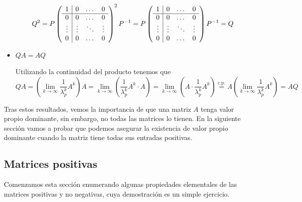 \documentclass[size=a4, parskip=half, titlepage=false, toc=flat, toc=bib, 12pt, twoside]{scrartcl}
\makeatletter
\renewenvironment{proof}[1][\proofname] {\par\pushQED{\qed}\normalfont\topsep6\p@\@plus6\p@\relax\trivlist\item[\hskip\labelsep\itshape\tgpaella#1\@addpunct{.}]\ignorespaces}{\popQED\endtrivlist\@endpefalse}
\theoremstyle{theorem-style}
\theoremstyle{definition-style}
\theoremstyle{remark-style}
\theoremstyle{example-style}
\theoremstyle{definition-style}
\theoremstyle{remark-style}
\renewcommand{\proofname}{\normalfont\tgpaella\bfseries\small DEMOSTRACIÓN}
\makeatother
\begin{document}
\begin{proof}
\begin{itemize}
$$Q^2 = P \left(
      \begin{array}{{c|ccc}}
            1         &    0      &   \dots    & 0\\\hline
            0         &    0       &    \dots    & 0 \\
            \vdots    &    \vdots  &  \ddots &  \vdots \\
           0          &     0       &    \dots    & 0
      \end{array}   \right)^2 P^{-1} = P \left(
            \begin{array}{{c|ccc}}
                  1         &    0      &   \dots    & 0\\\hline
                  0         &    0       &    \dots    & 0 \\
                  \vdots    &    \vdots  &  \ddots &  \vdots \\
                 0          &     0       &    \dots    & 0
            \end{array}   \right) P^{-1} = Q $$
\item $QA = AQ$

Utilizando la continuidad del producto tenemos que
$$QA = (\lim_{k \to \infty} \frac{1}{\lambda_p^k} A^k)A = \lim_{k \to \infty} (\frac{1}{\lambda_p^k} A^k \cdot A) = \lim_{k \to \infty} (A \cdot \frac{1}{\lambda_p^k} A^k) \overset{\textrm{c.p.}} = A ( \lim_{k \to \infty} \frac{1}{\lambda_p^k} A^k) = AQ$$

\end{itemize}
\end{proof}

Tras estos resultados, vemos la importancia de que una matriz $A$ tenga valor propio dominante, sin embargo, no todas las matrices lo tienen. En la siguiente sección vamos a probar que podemos asegurar la existencia de valor propio dominante cuando la matriz tiene todas sus entradas positivas.

\subsection{Matrices positivas}

Comenzamos esta sección enumerando algunas propiedades elementales de las matrices positivas y no negativas, cuya demostración es un simple ejercicio.
\end{document}
